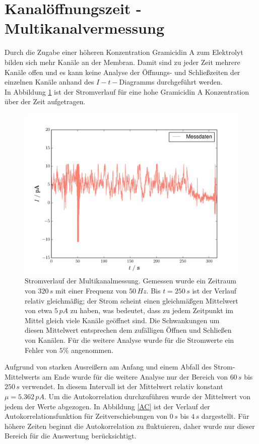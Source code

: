 \documentclass{include/thesisclass3}
\newcommand{\e}[1]{\,\si{#1}}
\begin{document}
\section{Kanalöffnungszeit - Multikanalvermessung}
Durch die Zugabe einer höheren Konzentration Gramicidin A zum Elektrolyt bilden sich mehr Kanäle an der Membran. Damit sind zu jeder Zeit mehrere Kanäle offen und es kann keine Analyse der Öffnungs- und Schließzeiten der einzelnen Kanäle anhand des $I-t-$Diagramms durchgeführt werden. \\In Abbildung \ref{multi} ist der Stromverlauf für eine hohe Gramicidin A Konzentration über der Zeit aufgetragen.
\begin{figure}[H]
\centering
\includegraphics[scale=0.7]{images/multi.pdf}
\caption{Stromverlauf der Multikanalmessung. Gemessen wurde ein Zeitraum von $320\e{s}$ mit einer Frequenz von $50\e{Hz}$. Bis $t = 250\e{s}$ ist der Verlauf relativ gleichmäßig; der Strom scheint einen gleichmäßgen Mittelwert von etwa $5\e{pA}$ zu haben, was bedeutet, dass zu jedem Zeitpunkt im Mittel gleich viele Kanäle geöffnet sind. Die Schwankungen um diesen Mittelwert entsprechen dem zufälligen Öffnen und Schließen von Kanälen. Für die weitere Analyse wurde für die Stromwerte ein Fehler von $5 \%$ angenommen.}
\label{multi}
\end{figure}
Aufgrund von starken Ausreißern am Anfang und einem Abfall des Strom-Mittelwerts am Ende wurde für die weitere Analyse nur der Bereich von $60\e{s}$ bis $250\e{s}$ verwendet. In diesem Intervall ist der Mittelwert relativ konstant $\mu = 5.362\e{pA}$. Um die Autokorrelation durchzuführen wurde der Mittelwert von jedem der Werte abgezogen. In Abbildung \ref{AC} ist der Verlauf der Autokorrelationsfunktion für Zeitverschiebungen von $0\e{s}$ bis $4\e{s}$ dargestellt. Für höhere Zeiten beginnt die Autokorrelation zu fluktuieren, daher wurde nur dieser Bereich für die Auswertung berücksichtigt.
\end{document}
